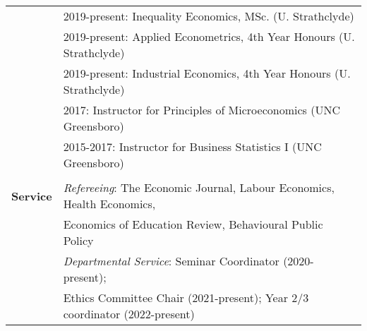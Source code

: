 \documentclass[11pt,a4paper]{article}
\begin{document}
\begin{longtable}{l l}
{																												&  2019-present: Inequality Economics, MSc. (U. Strathclyde)	   \\
																												&  2019-present: Applied Econometrics, 4th Year Honours (U. Strathclyde)  \\
																												&  2019-present: Industrial Economics, 4th Year Honours (U. Strathclyde)  \\
																												&  2017: Instructor for Principles of Microeconomics  (UNC Greensboro)  \\
																												&  2015-2017: Instructor for Business Statistics I  (UNC Greensboro)   \\
																												&  \\
\textbf{Service}							 								&  \textit{Refereeing}: The Economic Journal, Labour Economics, Health Economics,  \\
																												&  Economics of Education Review, Behavioural Public Policy  \\
\addlinespace
																												&  \textit{Departmental Service}: Seminar Coordinator (2020-present);  \\
																												&  Ethics Committee Chair (2021-present); Year 2/3 coordinator (2022-present)  \\ 																								
\end{longtable}


\end{document}
